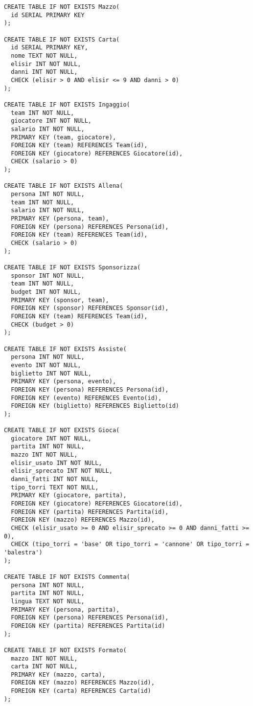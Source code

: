 \documentclass{article}
\begin{document}
\begin{lstlisting}
CREATE TABLE IF NOT EXISTS Mazzo(
  id SERIAL PRIMARY KEY
);

CREATE TABLE IF NOT EXISTS Carta(
  id SERIAL PRIMARY KEY,
  nome TEXT NOT NULL,
  elisir INT NOT NULL,
  danni INT NOT NULL,
  CHECK (elisir > 0 AND elisir <= 9 AND danni > 0)
);

CREATE TABLE IF NOT EXISTS Ingaggio(
  team INT NOT NULL,
  giocatore INT NOT NULL,
  salario INT NOT NULL,
  PRIMARY KEY (team, giocatore),
  FOREIGN KEY (team) REFERENCES Team(id),
  FOREIGN KEY (giocatore) REFERENCES Giocatore(id),
  CHECK (salario > 0)
);

CREATE TABLE IF NOT EXISTS Allena(
  persona INT NOT NULL,
  team INT NOT NULL,
  salario INT NOT NULL,
  PRIMARY KEY (persona, team),
  FOREIGN KEY (persona) REFERENCES Persona(id),
  FOREIGN KEY (team) REFERENCES Team(id),
  CHECK (salario > 0)
);

CREATE TABLE IF NOT EXISTS Sponsorizza(
  sponsor INT NOT NULL,
  team INT NOT NULL,
  budget INT NOT NULL,
  PRIMARY KEY (sponsor, team),
  FOREIGN KEY (sponsor) REFERENCES Sponsor(id),
  FOREIGN KEY (team) REFERENCES Team(id),
  CHECK (budget > 0)
);

CREATE TABLE IF NOT EXISTS Assiste(
  persona INT NOT NULL,
  evento INT NOT NULL,
  biglietto INT NOT NULL,
  PRIMARY KEY (persona, evento),
  FOREIGN KEY (persona) REFERENCES Persona(id),
  FOREIGN KEY (evento) REFERENCES Evento(id),
  FOREIGN KEY (biglietto) REFERENCES Biglietto(id)
);

CREATE TABLE IF NOT EXISTS Gioca(
  giocatore INT NOT NULL,
  partita INT NOT NULL,
  mazzo INT NOT NULL,
  elisir_usato INT NOT NULL,
  elisir_sprecato INT NOT NULL,
  danni_fatti INT NOT NULL,
  tipo_torri TEXT NOT NULL,
  PRIMARY KEY (giocatore, partita),
  FOREIGN KEY (giocatore) REFERENCES Giocatore(id),
  FOREIGN KEY (partita) REFERENCES Partita(id),
  FOREIGN KEY (mazzo) REFERENCES Mazzo(id),
  CHECK (elisir_usato >= 0 AND elisir_sprecato >= 0 AND danni_fatti >= 0),
  CHECK (tipo_torri = 'base' OR tipo_torri = 'cannone' OR tipo_torri = 'balestra')
);

CREATE TABLE IF NOT EXISTS Commenta(
  persona INT NOT NULL,
  partita INT NOT NULL,
  lingua TEXT NOT NULL,
  PRIMARY KEY (persona, partita),
  FOREIGN KEY (persona) REFERENCES Persona(id),
  FOREIGN KEY (partita) REFERENCES Partita(id)
);

CREATE TABLE IF NOT EXISTS Formato(
  mazzo INT NOT NULL,
  carta INT NOT NULL,
  PRIMARY KEY (mazzo, carta),
  FOREIGN KEY (mazzo) REFERENCES Mazzo(id),
  FOREIGN KEY (carta) REFERENCES Carta(id)
);


\end{lstlisting}
\end{document}
